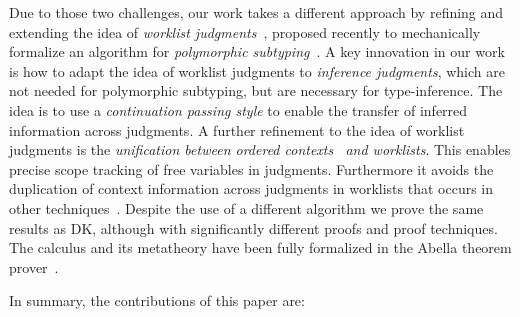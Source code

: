 Due to those two challenges, our work takes a different approach by refining and
extending the idea of \emph{worklist judgments}~\cite{itp2018},
proposed recently to mechanically formalize an algorithm for
\emph{polymorphic subtyping}~\cite{odersky1996putting}. A key innovation in our work is how
to adapt the idea of worklist judgments to
\emph{inference judgments}, which are not needed for polymorphic
subtyping, but are necessary for type-inference.  The idea is to use a \emph{continuation
passing style} to enable the transfer of inferred information across
judgments. A further refinement to the idea of worklist judgments is
the \emph{unification between ordered
  contexts~\cite{gundry2010type,dunfield2013complete} and worklists}.  This
enables precise scope tracking of free variables in
judgments. Furthermore it avoids the duplication of context
information across judgments in worklists that occurs in other
techniques~\cite{Reed2009,Abel2011higher}.
Despite the use of a different algorithm we prove the
same results as DK, although with significantly different proofs and
proof techniques. The calculus and its metatheory
have been fully formalized in the Abella theorem prover~\cite{AbellaDesc}.

In summary, the contributions of this paper are:

